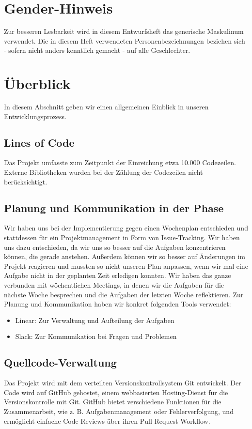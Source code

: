 \documentclass{implementierungsheft}
\begin{document}

\maketitle
\tableofcontents
\newpage

\section*{Gender-Hinweis}
Zur besseren Lesbarkeit wird in diesem Entwurfsheft das generische Maskulinum verwendet.
Die in diesem Heft verwendeten Personenbezeichnungen beziehen sich - sofern nicht anders kenntlich gemacht - auf alle Geschlechter.
\newpage
\section{Überblick}
In diesem Abschnitt geben wir einen allgemeinen Einblick in unseren Entwicklungsprozess.

\subsection{Lines of Code}
Das Projekt umfasste zum Zeitpunkt der Einreichung etwa 10.000 Codezeilen. Externe Bibliotheken wurden bei der Zählung der Codezeilen nicht berücksichtigt.
\subsection{Planung und Kommunikation in der Phase}
Wir haben uns bei der Implementierung gegen einen Wochenplan entschieden und stattdessen für ein Projektmanagement in Form von Issue-Tracking.
Wir haben uns dazu entschieden, da wir uns so besser auf die Aufgaben konzentrieren können, die gerade anstehen.
Außerdem können wir so besser auf Änderungen im Projekt reagieren und mussten so nicht unseren Plan anpassen, wenn wir mal eine Aufgabe nicht in der geplanten Zeit erledigen konnten.
Wir haben das ganze verbunden mit wöchentlichen Meetings, in denen wir die Aufgaben für die nächste Woche besprechen und die Aufgaben der letzten Woche reflektieren.
Zur Planung und Kommunikation haben wir konkret folgenden Tools verwendet:
\begin{itemize}
    \item Linear: Zur Verwaltung und Aufteilung der Aufgaben
    \item Slack: Zur Kommunikation bei Fragen und Problemen
\end{itemize}

\subsection{Quellcode-Verwaltung}
Das Projekt wird mit dem verteilten Versionskontrollsystem Git entwickelt. Der Code wird
auf GitHub gehostet, einem webbasierten Hosting-Dienst für die Versionskontrolle mit Git. GitHub bietet
verschiedene Funktionen für die Zusammenarbeit, wie z. B. Aufgabenmanagement oder Fehlerverfolgung, und ermöglicht einfache
Code-Reviews über ihren Pull-Request-Workflow.
\newpage
\end{document}
